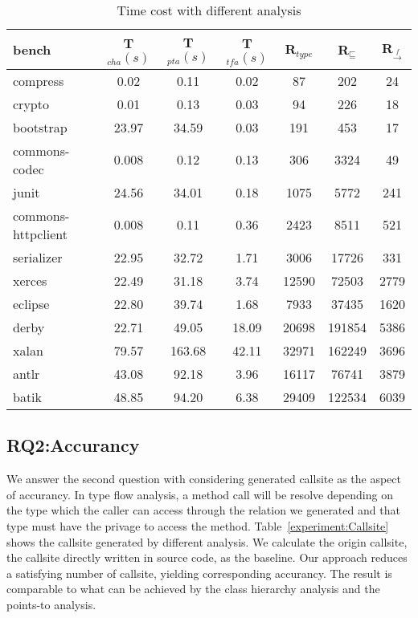 \documentclass{llncs}
\newcommand{\less}{\sqsubseteq}
\newcommand{\hflow}{\rightarrow}
\newcommand{\lhflow}[1]{\stackrel{#1}{\hflow}}
\begin{document}
\begin{table}[!htbp]\centering
\caption{Time cost with different analysis}
\begin{tabular}{lcccccc}
	\hline
	\textbf{bench} & \textbf{T$_{cha}(s)$} & \textbf{T$_{pta}(s)$} & \textbf{T$_{tfa}(s)$} & \textbf{R$_{type}$} & \textbf{R$_{\less}$} & \textbf{R$_{\lhflow{f}}$} \\
	\hline
	compress & 0.02 & 0.11 & 0.02 & 87 & 202 & 24\\
	crypto & 0.01 & 0.13 & 0.03 & 94 & 226 & 18\\
	bootstrap & 23.97 & 34.59 & 0.03 & 191 & 453 & 17\\
	commons-codec & 0.008 & 0.12 & 0.13 & 306 & 3324 & 49\\
	junit & 24.56 & 34.01 & 0.18 & 1075 & 5772 & 241\\
	commons-httpclient & 0.008 & 0.11 & 0.36 & 2423 & 8511 & 521 \\
	serializer & 22.95 & 32.72 & 1.71 & 3006 & 17726 & 331\\
	xerces & 22.49 & 31.18 & 3.74 & 12590 & 72503 & 2779\\
	eclipse & 22.80 & 39.74 & 1.68 & 7933 & 37435 & 1620\\
	derby & 22.71 & 49.05 & 18.09 & 20698 & 191854 & 5386\\
	xalan & 79.57 & 163.68 & 42.11 & 32971 & 162249 & 3696\\
	antlr & 43.08 & 92.18 & 3.96 & 16117 & 76741 & 3879\\
	batik & 48.85 & 94.20 & 6.38 & 29409 & 122534 & 6039 \\
	\hline
\end{tabular}
\label{experiment:Time Cost}
\end{table}

\subsection{RQ2:Accurancy}\label{subsec:accurancy}
We answer the second question with considering generated callsite as the aspect of accurancy. In type flow analysis, a method call will be resolve depending on the type which the caller can access through the relation we generated and that type must have the privage to access the method. Table~\ref{experiment:Callsite} shows the callsite generated by different analysis. We calculate the origin callsite, the callsite directly written in source code, as the baseline. Our approach reduces a satisfying number of callsite, yielding corresponding accurancy. The result is comparable to what can be achieved by the class hierarchy analysis and the points-to analysis.
\end{document}
